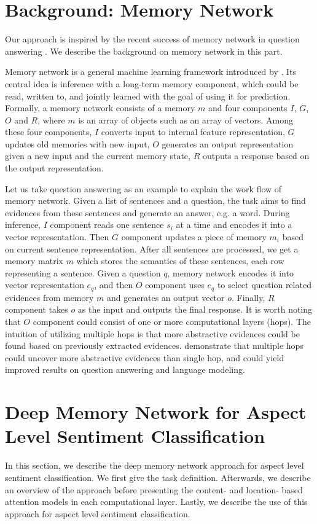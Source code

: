 \documentclass[11pt,letterpaper]{article}
\begin{document}
\section{Background: Memory Network}

Our approach is inspired by the recent success of memory network in question answering \cite{Weston2014memory,Sukhbaatar2015end}. 
We describe the background on memory network in this part.

Memory network is a general machine learning framework introduced by .
Its central idea is inference with a long-term memory component, which could be read, written to, and jointly learned with the goal of using it for prediction.
Formally, a memory network consists of a memory $m$ and four components $I$, $G$, $O$ and $R$, where 
$m$ is an array of objects such as an array of vectors. 
Among these four components, $I$ converts input to internal feature representation, $G$ updates old memories with new input, $O$ generates an output representation given a new input and the current memory state, $R$ outputs a response based on the output representation. 

Let us take question answering as an example to explain the work flow of memory network. Given a list of sentences and a question, the task aims to find evidences from these sentences and generate an answer, e.g. a word.
During inference, $I$ component reads one sentence $s_i$ at a time and encodes it into a vector representation.
Then $G$ component updates a piece of memory $m_i$ based on current sentence representation. 
After all sentences are processed, we get a memory matrix $m$ which stores the semantics of these sentences, each row representing a sentence. 
Given a question $q$, memory network encodes it into vector representation $e_q$, and then $O$ component uses $e_q$ to select question related evidences from memory $m$ and generates an output vector $o$. 
Finally, $R$ component takes $o$ as the input and outputs the final response.
It is worth noting that $O$ component could consist of one or more computational layers (hops). 
The intuition of utilizing multiple hops is that more abstractive evidences could be found based on previously extracted evidences.  
 demonstrate that multiple hops could uncover more abstractive evidences than single hop, and could yield improved results on question answering and language modeling. 

\section{Deep Memory Network for Aspect Level Sentiment Classification}
In this section, we describe the deep memory network approach for aspect level sentiment classification. 
We first give the task definition. 
Afterwards, we describe an overview of the approach before presenting the content- and location- based attention models in each computational layer.
Lastly, we describe the use of this approach for aspect level sentiment classification.
\end{document}
